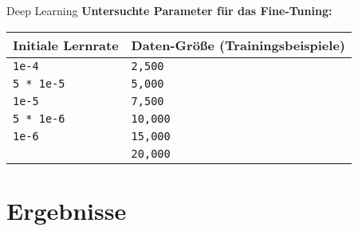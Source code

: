 \documentclass[aspectratio=169]{beamer} %
\begin{document}
\begin{frame}{Deep Learning}
  \Large
  \textbf{Untersuchte Parameter für das Fine-Tuning:}
  \vspace{0.5cm}

  \centering
  \renewcommand{\arraystretch}{1.2}
  \begin{tabular}{l|l}
      \hline
      {Initiale Lernrate} & {Daten-Größe (Trainingsbeispiele)} \\
      \hline
      \texttt{1e-4}  & \texttt{2,500}  \\
      \texttt{5 * 1e-5}  & \texttt{5,000}  \\
      \texttt{1e-5}  & \texttt{7,500}  \\
      \texttt{5 * 1e-6}  & \texttt{10,000}  \\
      \texttt{1e-6}  & \texttt{15,000}  \\
      & \texttt{20,000}  \\
      \hline
  \end{tabular}

\end{frame}


\section{Ergebnisse}
\end{document}

